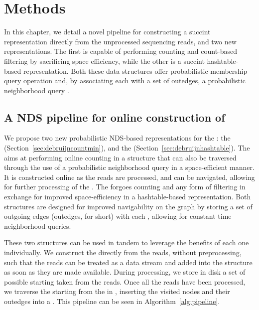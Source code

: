 \chapter{Methods}

In this chapter, we detail a novel pipeline for constructing a succint \dBG representation directly from the unprocessed sequencing reads, and two new \dBG representations. The first is capable of performing \kmer counting and count-based filtering by sacrificing space efficiency, while the other is a succint hashtable-based representation. Both these data structures offer probabilistic membership query operation and, by associating each \kmer with a set of outedges, a probabilistic neighborhood query .

\section{A NDS pipeline for online construction of }\label{sec:pipeline}

We propose two new probabilistic NDS-based representations for the \dBG: the \keyterm{\dB \cm} \dBCM (Section~\ref{sec:debruijncountmin}), and the  \dBHT (Section~\ref{sec:debruijnhashtable}). The \dBCM aims at performing online \kmer counting in a structure that can also be traversed through the use of a probabilistic neighborhood query in a space-efficient manner. It is constructed online as the reads are processed, and can be navigated, allowing for further processing of the \dBG. The \dBHT forgoes \kmer counting and any form of filtering in exchange for improved space-efficiency in a hashtable-based representation. Both structures are designed for improved navigability on the graph by storing a set of outgoing edges (outedges, for short) with each \kmer, allowing for constant time neighborhood queries. 

These two structures can be used in tandem to leverage the benefits of each one individually. We construct the \dBCM directly from the reads, without preprocessing, such that the reads can be treated as a data stream and added into the structure as soon as they are made available. During processing, we store in disk a set of possible starting   taken from the reads. Once all the reads have been processed, we traverse the \dBCM starting from the  in , inserting the visited nodes and their outedges into a \dBHT. This pipeline can be seen in Algorithm~\ref{alg:pipeline}.

